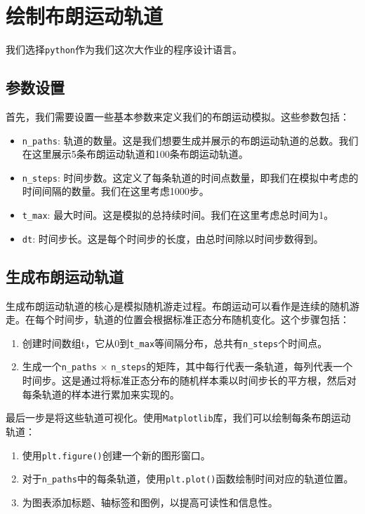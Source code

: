 \documentclass[12pt,a4paper]{article}
\begin{document}
\section{绘制布朗运动轨道}
我们选择\lstinline|python|作为我们这次大作业的程序设计语言。
\subsection{参数设置}
首先，我们需要设置一些基本参数来定义我们的布朗运动模拟。这些参数包括：
\begin{itemize}
    \item \lstinline|n_paths|: 轨道的数量。这是我们想要生成并展示的布朗运动轨道的总数。我们在这里展示5条布朗运动轨道和100条布朗运动轨道。
    \item \lstinline|n_steps|: 时间步数。这定义了每条轨道的时间点数量，即我们在模拟中考虑的时间间隔的数量。我们在这里考虑1000步。
    \item \lstinline|t_max|: 最大时间。这是模拟的总持续时间。我们在这里考虑总时间为1。
    \item \lstinline|dt|: 时间步长。这是每个时间步的长度，由总时间除以时间步数得到。
\end{itemize}
\subsection{生成布朗运动轨道}
生成布朗运动轨道的核心是模拟随机游走过程。布朗运动可以看作是连续的随机游走。在每个时间步，轨道的位置会根据标准正态分布随机变化。这个步骤包括：
\begin{enumerate}
    \item 创建时间数组t，它从0到\lstinline|t_max|等间隔分布，总共有\lstinline|n_steps|个时间点。
    \item 生成一个\lstinline|n_paths| $\times$ \lstinline|n_steps|的矩阵，其中每行代表一条轨道，每列代表一个时间步。这是通过将标准正态分布的随机样本乘以时间步长的平方根，然后对每条轨道的样本进行累加来实现的。
\end{enumerate}
最后一步是将这些轨道可视化。使用\lstinline|Matplotlib|库，我们可以绘制每条布朗运动轨道：
\begin{enumerate}
    \item 使用\lstinline|plt.figure()|创建一个新的图形窗口。
    \item 对于\lstinline|n_paths|中的每条轨道，使用\lstinline|plt.plot()|函数绘制时间对应的轨道位置。
    \item 为图表添加标题、轴标签和图例，以提高可读性和信息性。
\end{enumerate}
\end{document}

